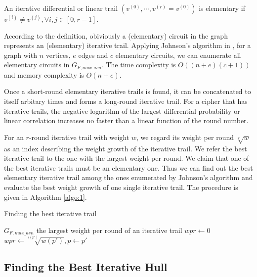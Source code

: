 \begin{definition}
    An iterative differential or linear trail $(v^{(0)},\cdots,v^{(r)}=v^{(0)})$ is elementary if $v^{(i)}\neq v^{(j)},\forall i,j\in [0,r-1]$.
\end{definition}

According to the definition, obiviously a (elementary) circuit in the graph represents an (elementary) iterative trail. Applying Johnson's algorithm in \cite{J75}, for a graph with $n$ vertices, $e$ edges and $c$ elementary circuits, we can enumerate all elementary circuits in $G_{F,max\_asn}$. The time complexity is $O((n + e)(c + 1))$ and memory complexity is $O(n + e)$.

Once a short-round elementary iterative trails is found, it can be concatenated to itself arbitary times and forms a long-round iterative trail. For a cipher that has iterative trails, the negative logarithm of the largest differential probability or linear correlation increases no faster than a linear function of the round number. 

For an $r$-round iterative trail with weight $w$, we regard its weight per round $\sqrt[r]{w}$ as an index describing the weight growth of the iterative trail. We refer the best iterative trail to the one with the largest weight per round. We claim that one of the best iterative trails must be an elementary one. Thus we can find out the best elementary iterative trail among the ones enumerated by Johnson's algorithm \cite{J75} and evaluate the best weight growth of one single iterative trail. The procedure is given in Algorithm \ref{algo:1}. %

\begin{algorithm}
	\caption{Finding the best iterative trail}
	\label{algo:1}
	\begin{algorithmic}[1]
		\Require $G_{F,max\_asn}$
		\Ensure the largest weight per round of an iterative trail
		\Procedure {}{}
		\State $wpr\leftarrow 0$
		\State $wpr\leftarrow \sqrt[l(p')]{w(p')},p\leftarrow p'$
		\EndIf
		\EndFor
		\State {}
		\EndProcedure
	\end{algorithmic}
\end{algorithm}

\subsection{Finding the Best Iterative Hull}\label{sec:fbih}

